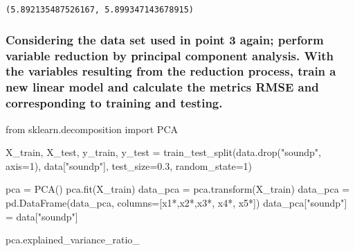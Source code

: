\documentclass[
  letterpaper,
  DIV=11,
  numbers=noendperiod]{scrartcl}
\newenvironment{Shaded}{\begin{snugshade}}{\end{snugshade}}
\newcommand{\DecValTok}[1]{\textcolor[rgb]{0.68,0.00,0.00}{#1}}
\newcommand{\FloatTok}[1]{\textcolor[rgb]{0.68,0.00,0.00}{#1}}
\newcommand{\ImportTok}[1]{\textcolor[rgb]{0.00,0.46,0.62}{#1}}
\newcommand{\NormalTok}[1]{\textcolor[rgb]{0.00,0.23,0.31}{#1}}
\newcommand{\OperatorTok}[1]{\textcolor[rgb]{0.37,0.37,0.37}{#1}}
\newcommand{\StringTok}[1]{\textcolor[rgb]{0.13,0.47,0.30}{#1}}
\begin{document}
\begin{verbatim}
(5.892135487526167, 5.899347143678915)
\end{verbatim}

\hypertarget{considering-the-data-set-used-in-point-3-again-perform-variable-reduction-by-principal-component-analysis.-with-the-variables-resulting-from-the-reduction-process-train-a-new-linear-model-and-calculate-the-metrics-rmse-and-corresponding-to-training-and-testing.}{%
\subsubsection{Considering the data set used in point 3 again; perform
variable reduction by principal component analysis. With the variables
resulting from the reduction process, train a new linear model and
calculate the metrics RMSE and corresponding to training and
testing.}\label{considering-the-data-set-used-in-point-3-again-perform-variable-reduction-by-principal-component-analysis.-with-the-variables-resulting-from-the-reduction-process-train-a-new-linear-model-and-calculate-the-metrics-rmse-and-corresponding-to-training-and-testing.}}

\begin{Shaded}
\begin{Highlighting}[]
\ImportTok{from}\NormalTok{ sklearn.decomposition }\ImportTok{import}\NormalTok{ PCA}

\NormalTok{X\_train, X\_test, y\_train, y\_test }\OperatorTok{=}\NormalTok{ train\_test\_split(data.drop(}\StringTok{"soundp"}\NormalTok{, axis}\OperatorTok{=}\DecValTok{1}\NormalTok{),}
\NormalTok{                                                    data[}\StringTok{"soundp"}\NormalTok{],}
\NormalTok{                                                    test\_size}\OperatorTok{=}\FloatTok{0.3}\NormalTok{, random\_state}\OperatorTok{=}\DecValTok{1}\NormalTok{)}

\NormalTok{pca }\OperatorTok{=}\NormalTok{ PCA()}
\NormalTok{pca.fit(X\_train)}
\NormalTok{data\_pca }\OperatorTok{=}\NormalTok{ pca.transform(X\_train)}
\NormalTok{data\_pca }\OperatorTok{=}\NormalTok{ pd.DataFrame(data\_pca, columns}\OperatorTok{=}\NormalTok{[}\StringTok{\textquotesingle{}x1*\textquotesingle{}}\NormalTok{,}\StringTok{\textquotesingle{}x2*\textquotesingle{}}\NormalTok{,}\StringTok{\textquotesingle{}x3*\textquotesingle{}}\NormalTok{, }\StringTok{\textquotesingle{}x4*\textquotesingle{}}\NormalTok{, }\StringTok{\textquotesingle{}x5*\textquotesingle{}}\NormalTok{])}
\NormalTok{data\_pca[}\StringTok{"soundp"}\NormalTok{] }\OperatorTok{=}\NormalTok{ data[}\StringTok{"soundp"}\NormalTok{]}

\NormalTok{pca.explained\_variance\_ratio\_}
\end{Highlighting}
\end{Shaded}
\end{document}
